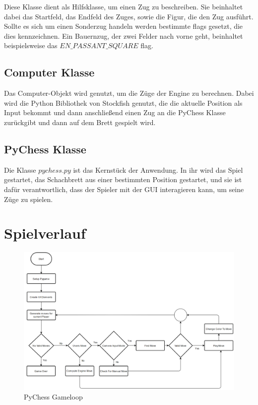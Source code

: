 Diese Klasse dient als Hilfsklasse, um einen Zug zu beschreiben. Sie beinhaltet dabei das Startfeld, das Endfeld des Zuges, sowie die Figur, die den Zug ausführt.
Sollte es sich um einen Sonderzug handeln werden bestimmte flags gesetzt, die dies kennzeichnen. Ein Bauernzug, der zwei Felder nach vorne geht, beinhaltet
beispielsweise das \(EN\_PASSANT\_SQUARE\) flag.

\subsection{Computer Klasse}
Das Computer-Objekt wird genutzt, um die Züge der Engine zu berechnen. Dabei wird die Python Bibliothek von Stockfish genutzt, die die aktuelle Position 
als Input bekommt und dann anschließend einen Zug an die PyChess Klasse zurückgibt und dann auf dem Brett gespielt wird.

\subsection{PyChess Klasse}
Die Klasse \(pychess.py\) ist das Kernstück der Anwendung. In ihr wird das Spiel gestartet, das Schachbrett aus einer bestimmten Position gestartet,
und sie ist dafür verantwortlich, dass der Spieler mit der GUI interagieren kann, um seine Züge zu spielen.

\section{Spielverlauf}
\begin{figure}[H]
    \centering
    \includegraphics[scale=0.45]{images/game_loop_flowchart.png}
    \caption{PyChess Gameloop}
\end{figure}
